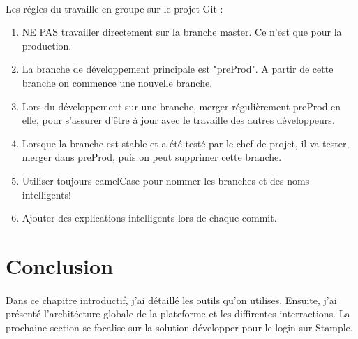 \paragraph{}
Les régles du travaille en groupe sur le projet Git :
\begin{enumerate}
\item NE PAS travailler directement sur la branche master. Ce n'est que pour la production.
\item La branche de développement principale est "preProd". A partir de cette branche on commence une nouvelle branche. 
\item Lors du développement sur une branche, merger régulièrement preProd en elle, pour s'assurer d'être à jour avec le travaille des autres développeurs.
\item Lorsque la branche est stable et a été testé par le chef de projet, il va tester, merger dans preProd, puis on peut supprimer cette branche.
\item Utiliser toujours camelCase pour nommer les branches et des noms intelligents!
\item Ajouter des explications intelligents lors de chaque commit.
\end{enumerate}
\section{Conclusion}
\paragraph{}
Dans ce chapitre introductif, j'ai détaillé les outils qu'on utilises. Ensuite, j'ai présenté l'architécture globale de la plateforme et les diffirentes interractions. La prochaine section se focalise sur la solution développer pour le login sur Stample.
